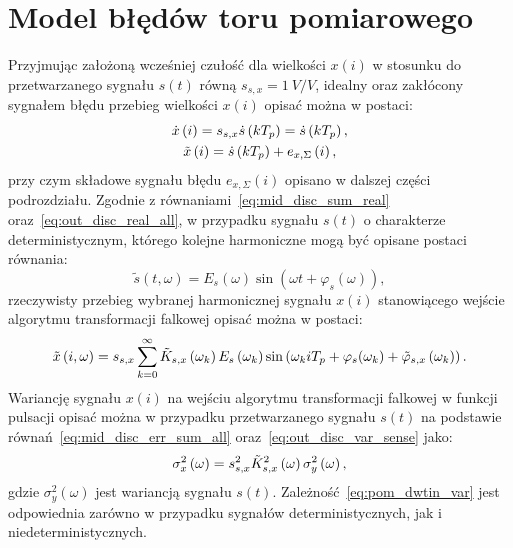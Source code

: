 \section{Model błędów toru pomiarowego}

Przyjmując założoną wcześniej czułość dla wielkości $x(i)$ w stosunku do przetwarzanego sygnału $s(t)$ równą $s_{s,x} = \qty{1}{V \per V}$, idealny oraz zakłócony sygnałem błędu przebieg wielkości $x(i)$ opisać można w postaci:
\begin{gather}
\dot{x} \left(i\right) = s_{s,x} \dot{s} \left(kT_{p}\right) = \dot{s} \left(kT_{p}\right) \label{eq:pom_dwtin_ideal}, \\
\tilde{x} \left(i\right) = \dot{s} \left(kT_{p}\right) + e_{x,\Sigma} \left(i\right) \label{eq:pom_dwtin_real},
\end{gather}
przy czym składowe sygnału błędu $e_{x,\Sigma}(i)$ opisano w dalszej części podrozdziału. Zgodnie z równaniami~\eqref{eq:mid_disc_sum_real} oraz~\eqref{eq:out_disc_real_all}, w przypadku sygnału $s(t)$ o charakterze deterministycznym, którego kolejne harmoniczne mogą być opisane postaci równania:
\begin{equation}
\tilde{s}(t,\omega) = E_{s}(\omega) \sin(\omega t + \varphi_{s}(\omega)) \label{eq:pom_dwtin_harm_ideal},
\end{equation}
rzeczywisty przebieg wybranej harmonicznej sygnału $x(i)$ stanowiącego wejście algorytmu transformacji falkowej opisać można w postaci:
\begin{equation}
\tilde{x} \left(i,\omega\right) =  s_{s,x} \sum_{k = 0} ^{\infty} \tilde{K}_{s,x} \left(\omega_{k}\right) E_{s} \left(\omega_{k}\right) \sin \left(\omega_{k} i T_{p} + \varphi_{s}(\omega_{k}) + \tilde{\varphi}_{s,x} \left(\omega_{k}\right)\right) \label{eq:pom_dwtin_harmsum}.
\end{equation}
Wariancję sygnału $x(i)$ na wejściu algorytmu transformacji falkowej w funkcji pulsacji opisać można w przypadku przetwarzanego sygnału $s(t)$ na podstawie równań~\eqref{eq:mid_disc_err_sum_all} oraz~\eqref{eq:out_disc_var_sense} jako:
\begin{equation}
\sigma_{x}^{2} \left(\omega\right) = s_{s,x}^{2} \tilde{K}_{s,x}^{2} \left(\omega\right) \sigma_{y}^{2} \left(\omega\right) \label{eq:pom_dwtin_var},
\end{equation}
gdzie $\sigma_{y}^{2}(\omega)$ jest wariancją sygnału $s(t)$. Zależność~\eqref{eq:pom_dwtin_var} jest odpowiednia zarówno w przypadku sygnałów deterministycznych, jak i niedeterministycznych.

